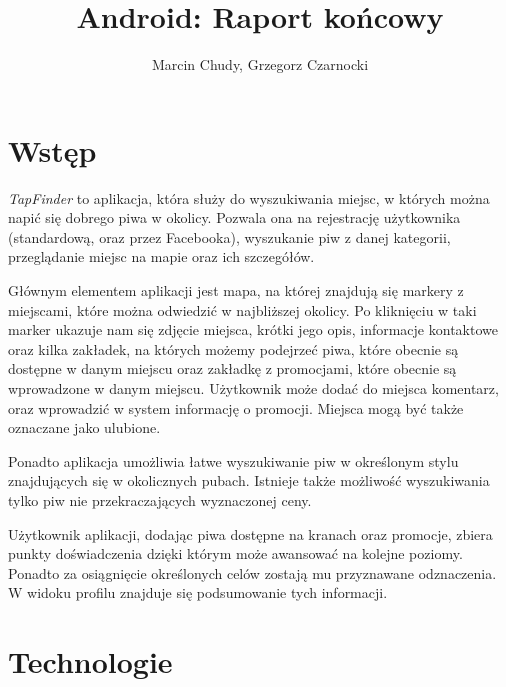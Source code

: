 \documentclass[a4paper]{article}
\title{Android: Raport końcowy}
\author{Marcin Chudy, Grzegorz Czarnocki}
\begin{document}
\maketitle



\section{Wstęp}

\textit{TapFinder} to aplikacja, która służy do wyszukiwania miejsc, w których można napić się dobrego piwa w okolicy. Pozwala ona na rejestrację użytkownika (standardową, oraz przez Facebooka), wyszukanie piw z danej kategorii, przeglądanie miejsc na mapie oraz ich szczegółów.

Głównym elementem aplikacji jest mapa, na której znajdują się markery z miejscami, które można odwiedzić w najbliższej okolicy. Po kliknięciu w taki marker ukazuje nam się zdjęcie miejsca, krótki jego opis, informacje kontaktowe oraz kilka zakładek, na których możemy podejrzeć piwa, które obecnie są dostępne w danym miejscu oraz zakładkę z promocjami, które obecnie są wprowadzone w danym miejscu. Użytkownik może dodać do miejsca komentarz, oraz wprowadzić w system informację o promocji. Miejsca mogą być także oznaczane jako ulubione.

Ponadto aplikacja umożliwia łatwe wyszukiwanie piw w określonym stylu znajdujących się w okolicznych pubach. Istnieje także możliwość wyszukiwania tylko piw nie przekraczających wyznaczonej ceny.

Użytkownik aplikacji, dodając piwa dostępne na kranach oraz promocje, zbiera punkty doświadczenia dzięki którym może awansować na kolejne poziomy. Ponadto za osiągnięcie określonych celów zostają mu przyznawane odznaczenia. W widoku profilu znajduje się podsumowanie tych informacji.

\section{Technologie}
\end{document}
